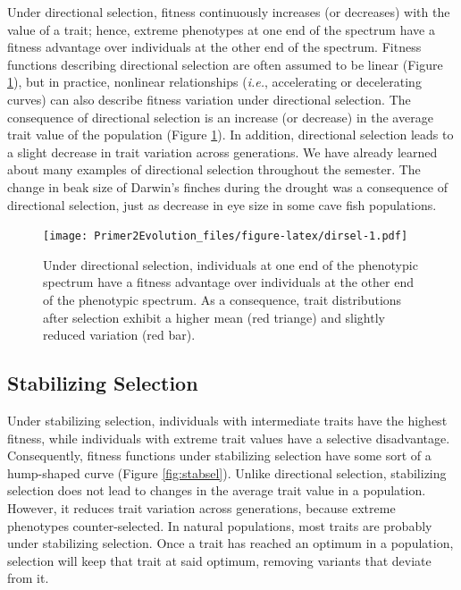 \documentclass[
]{book}
\begin{document}
Under directional selection, fitness continuously increases (or decreases) with the value of a trait; hence, extreme phenotypes at one end of the spectrum have a fitness advantage over individuals at the other end of the spectrum. Fitness functions describing directional selection are often assumed to be linear (Figure \ref{fig:dirsel}), but in practice, nonlinear relationships (\emph{i.e.}, accelerating or decelerating curves) can also describe fitness variation under directional selection. The consequence of directional selection is an increase (or decrease) in the average trait value of the population (Figure \ref{fig:dirsel}). In addition, directional selection leads to a slight decrease in trait variation across generations. We have already learned about many examples of directional selection throughout the semester. The change in beak size of Darwin's finches during the drought was a consequence of directional selection, just as decrease in eye size in some cave fish populations.

\begin{figure}
\centering
\texttt{[image: Primer2Evolution\_files/figure-latex/dirsel-1.pdf]}
\caption{\label{fig:dirsel}Under directional selection, individuals at one end of the phenotypic spectrum have a fitness advantage over individuals at the other end of the phenotypic spectrum. As a consequence, trait distributions after selection exhibit a higher mean (red triange) and slightly reduced variation (red bar).}
\end{figure}

\hypertarget{stabilizing-selection}{%
\subsection{Stabilizing Selection}\label{stabilizing-selection}}

Under stabilizing selection, individuals with intermediate traits have the highest fitness, while individuals with extreme trait values have a selective disadvantage. Consequently, fitness functions under stabilizing selection have some sort of a hump-shaped curve (Figure \ref{fig:stabsel}). Unlike directional selection, stabilizing selection does not lead to changes in the average trait value in a population. However, it reduces trait variation across generations, because extreme phenotypes counter-selected. In natural populations, most traits are probably under stabilizing selection. Once a trait has reached an optimum in a population, selection will keep that trait at said optimum, removing variants that deviate from it.
\end{document}
